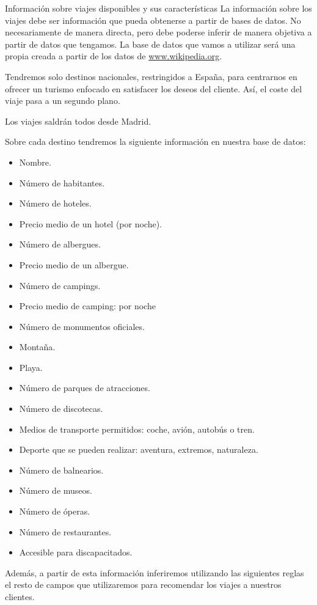 \documentclass[11pt, a4paper, spanish, openright, twoside]{book}
\begin{document}
	\begin{section}{Información sobre viajes disponibles y sus características}
		La información sobre los viajes debe ser información que pueda obtenerse a partir de bases de datos. No necesariamente de manera directa, pero debe poderse inferir de manera objetiva 
		a partir de datos que tengamos. La base de datos que vamos a utilizar será una propia creada a partir de los datos de \url{www.wikipedia.org}. 
		
		Tendremos solo destinos nacionales, restringidos a España, para centrarnos en ofrecer un turismo enfocado en satisfacer los deseos del cliente. Así, el coste del viaje pasa a un segundo plano.
		
		Los viajes saldrán todos desde Madrid.
		
		Sobre cada destino tendremos la siguiente información en nuestra base de datos:
			\begin{itemize}
				\item Nombre.
				\item Número de habitantes.
				\item Número de hoteles.
				\item Precio medio de un hotel (por noche).
				\item Número de albergues.
				\item Precio medio de un albergue.
				\item Número de campings.
				\item Precio medio de camping: por noche
				\item Número de monumentos oficiales.
				\item Montaña.
				\item Playa.
				\item Número de parques de atracciones.
				\item Número de discotecas.
				\item Medios de transporte permitidos: coche, avión, autobús o tren.
				\item Deporte que se pueden realizar: aventura, extremos, naturaleza.
				\item Número de balnearios. 
				\item Número de museos.
				\item Número de óperas.
				\item Número de restaurantes.
				\item Accesible para discapacitados.
				
						
			\end{itemize}
			Además, a partir de esta información inferiremos utilizando las siguientes reglas el resto de campos que utilizaremos para
			recomendar los viajes a nuestros clientes.
			

\end{section}
\end{document}
